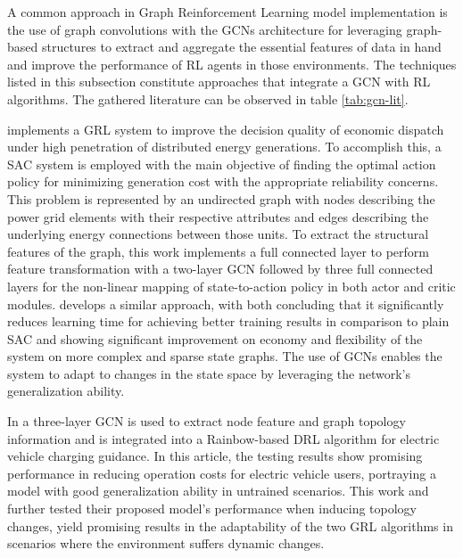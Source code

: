 A common approach in Graph Reinforcement Learning model implementation is the use of graph convolutions with the \acp{GCN} architecture for leveraging graph-based structures to extract and aggregate the essential features of data in hand and improve the performance of \ac{RL} agents in those environments. The techniques listed in this subsection constitute approaches that integrate a \ac{GCN} with \ac{RL} algorithms. The gathered literature can be observed in table \ref{tab:gcn-lit}. \par
\cite{liNovelGraphReinforcement2022} implements a \ac{GRL} system to improve the decision quality of economic dispatch under high penetration of distributed energy generations. To accomplish this, a \ac{SAC} system is employed with the main objective of finding the optimal action policy for minimizing generation cost with the appropriate reliability concerns. This problem is represented by an undirected graph with nodes describing the power grid elements with their respective attributes and edges describing the underlying energy connections between those units. To extract the structural features of the graph, this work implements a full connected layer to perform feature transformation with a two-layer \ac{GCN} followed by three full connected layers for the non-linear mapping of state-to-action policy in both actor and critic modules. \cite{chenScalableGraphReinforcement2023} develops a similar approach, with both concluding that it significantly reduces learning time for achieving better training results in comparison to plain \ac{SAC} and showing significant improvement on economy and flexibility of the system on more complex and sparse state graphs. The use of \acp{GCN} enables the system to adapt to changes in the state space by leveraging the network's generalization ability.\par
In \cite{xingGraphReinforcementLearningBased2023} a three-layer \ac{GCN} is used to extract node feature and graph topology information and is integrated into a Rainbow-based \cite{hesselRainbowCombiningImprovements2018} \ac{DRL} algorithm for electric vehicle charging guidance. In this article, the testing results show promising performance in reducing operation costs for electric vehicle users, portraying a model with good generalization ability in untrained scenarios. This work and  \cite{chenScalableGraphReinforcement2023} further tested their proposed model's performance when inducing topology changes, yield promising results in the adaptability of the two \ac{GRL} algorithms in scenarios where the environment suffers dynamic changes.\par
